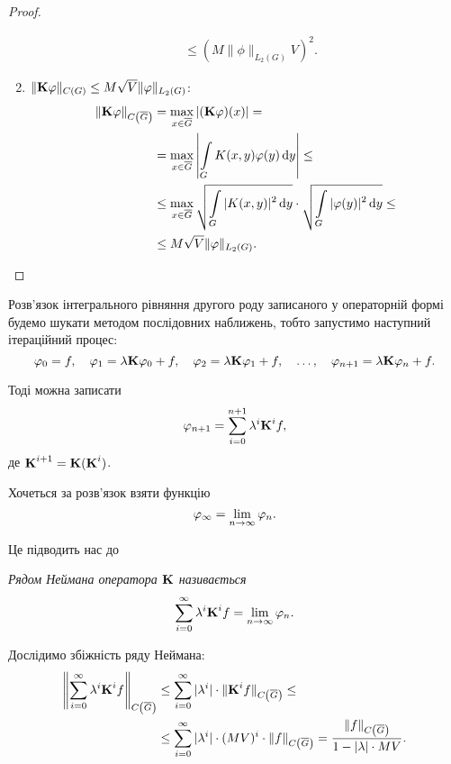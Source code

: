 \begin{proof}
\begin{enumerate}
\begin{equation}
\begin{aligned}
				&\le (M \| \phi\|_{L_2(G)} V)^2.
			\end{aligned}
		\end{equation}
		\item $\| \bf{K} \phi \|_{C(G)} \le M \sqrt{V} \| \phi \|_{L_2(G)}$:
		\begin{equation}
			\begin{aligned}
				\| \bf{K} \phi \|_{C\left(\overline G\right)} &= \Max_{x \in \overline G} |(\bf{K} \phi) (x)| = \\
				&= \Max_{x \in \overline G} \left| \Int_G K(x, y) \phi(y) \diff y \right| \le \\
				&\le \Max_{x \in \overline G} \sqrt{\Int_G |K(x, y)|^2 \diff y} \cdot \sqrt{\Int_G |\phi(y)|^2 \diff y} \le \\
				&\le M \sqrt{V} \|\phi\|_{L_2(G)}.
			\end{aligned}
		\end{equation}
	\end{enumerate}
\end{proof}

Розв'язок інтегрального рівняння другого роду записаного у операторній формі будемо шукати методом послідовних наближень, тобто запустимо наступний ітераційний процес:
\begin{equation}
	\phi_0 = f, \quad \phi_1 = \lambda \bf{K} \phi_0 + f, \quad \phi_2 = \lambda \bf{K} \phi_1 + f, \quad \ldots, \quad \phi_{n + 1} = \lambda \bf{K} \phi_n + f.
\end{equation}

Тоді можна записати
\begin{equation}
	\phi_{n + 1} = \Sum_{i = 0}^{n + 1} \lambda^i \bf{K}^i f,
\end{equation}
де
$\bf{K}^{i + 1} = \bf{K} (\bf{K}^i)$. \medskip

Хочеться за розв'язок взяти функцію
\begin{equation}
	\phi_\infty = \Lim_{n \to \infty} \phi_{n}.
\end{equation}

Це підводить нас до
\begin{definition}
	\it{Рядом Неймана} оператора $\bf{K}$ називається
	\begin{equation}
		\Sum_{i = 0}^\infty \lambda^i \bf{K}^i f = \Lim_{n \to \infty} \phi_{n}.
	\end{equation}
\end{definition}

Дослідимо збіжність ряду Неймана:
\begin{equation}
	\begin{aligned}
		\left\| \Sum_{i = 0}^\infty \lambda^i \bf{K}^i f \right\|_{C\left(\overline G\right)} &\le \Sum_{i = 0}^\infty |\lambda^i| \cdot \| \bf{K}^i f \|_{C\left(\overline G\right)} \le \\
		&\le \Sum_{i = 0}^\infty |\lambda^i| \cdot (MV)^i \cdot \| f \|_{C\left(\overline G\right)} = \dfrac{\|f\|_{C\left(\overline G\right)}}{1 - |\lambda| \cdot MV}.
	\end{aligned}
\end{equation}

